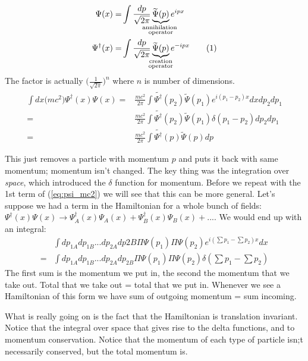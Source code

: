 \documentclass[]{article}
\newcommand\numberthis{\addtocounter{equation}{1}\tag{\theequation}}
\begin{document}
\begin{align*}
	\Psi(x) =& \int \frac{dp}{\sqrt{2\pi}} \underbrace{ \widetilde{\Psi}(p)}_{\mathclap{\substack{\text{annihilation }\\
								\text{operator}}}} e^{ipx}\\
	\Psi^\dagger (x) =& \int \frac{dp}{\sqrt{2\pi}} \underbrace{ \widetilde{\Psi}(p)}_{\mathclap{\substack{\text{creation} \\
	\text{operator}}}} e^{-ipx} \numberthis \label{eq:psi:dagger}
\end{align*}
 The factor is actually $\big(\frac{1}{\sqrt{2\pi}}\big)^n$ where $n$ is number of dimensions.
\begin{align*}
	\int dx \big(mc^2\big) \Psi^\dagger(x) \Psi(x) =& \frac{mc^2}{2 \pi} \int \widetilde{\Psi^\dagger}(p_2) \widetilde{\Psi}(p_1) e^{i(p_1-p_2)x} dx dp_2 dp_1\\
	=& \frac{mc^2}{2 \pi} \int \widetilde{\Psi^\dagger}(p_2) \widetilde{\Psi}(p_1) \delta(p_1-p_2) dp_2 dp_1\\
	=& \frac{mc^2}{2 \pi} \int \widetilde{\Psi^\dagger}(p) \widetilde{\Psi}(p) dp
\end{align*}

This just removes a particle with momentum $p$ and puts it back with same momentum; momentum isn't changed. The key thing was the integration over \emph{space}, which introduced the $\delta$ function for momentum. Before we repeat with the 1st term of (\ref{eq:psi_mc2}) we will see that this can be more general. Let's suppose we had a term in the Hamiltonian for a whole bunch of fields: $\Psi^\dagger(x) \Psi(x)\rightarrow \Psi^\dagger_A(x) \Psi_A(x) + \Psi^\dagger_B(x) \Psi_B(x)+...$. We would end up with an integral:
\begin{align*}
	&\int dp_{1A} dp_{1B}...dp_{2A} dp {2B} \Pi \Psi(p_1) \Pi \Psi(p_2) e^{i(\sum p_1-\sum p_2)x} dx\\
	=&\int dp_{1A} dp_{1B}...dp_{2A} dp_{2B} \Pi \Psi(p_1) \Pi \Psi(p_2) \delta(\sum p_1-\sum p_2) 
\end{align*}
The first sum is the momentum we put in, the second the momentum that we take out. Total that we take out = total that we put in. Whenever we see a Hamiltonian of this form we have sum of outgoing momentum = sum incoming.

What is really going on is the fact that the Hamiltonian is translation invariant. Notice that the integral over space that gives rise to the delta functions, and to momentum conservation. Notice that the momentum of each type of particle isn;t necessarily conserved, but the total momentum is.
\end{document}
